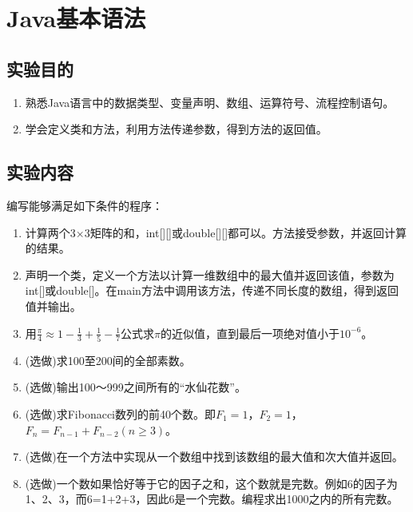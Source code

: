 ﻿\documentclass[cs5size,b5paper,nofonts,twoside]{ctexart}
\begin{document}
{\linespread{1}}

{\linespread{1}}

{\linespread{1}}

{\linespread{1}}

\clearpage
\section{Java基本语法}
\subsection{实验目的}
\begin{enumerate}
\item 熟悉Java语言中的数据类型、变量声明、数组、运算符号、流程控制语句。
\item 学会定义类和方法，利用方法传递参数，得到方法的返回值。
\end{enumerate}
\subsection{实验内容}
编写能够满足如下条件的程序：
\begin{enumerate}
\item 计算两个3$\times$3矩阵的和，int[][]或double[][]都可以。方法接受参数，并返回计算的结果。
\item 声明一个类，定义一个方法以计算一维数组中的最大值并返回该值，参数为int[]或double[]。在main方法中调用该方法，传递不同长度的数组，得到返回值并输出。
\item 用$\frac{\pi}{4}\approx 1-\frac{1}{3}+\frac{1}{5}-\frac{1}{7}$公式求$\pi$的近似值，直到最后一项绝对值小于$10^{-6}$。
\item (选做)求100至200间的全部素数。
\item (选做)输出100～999之间所有的“水仙花数”。
\item (选做)求Fibonacci数列的前40个数。即$F_1=1$，$F_2=1$，$F_n=F_{n-1}+F_{n-2} (n\ge 3)$。
\item (选做)在一个方法中实现从一个数组中找到该数组的最大值和次大值并返回。
\item (选做)一个数如果恰好等于它的因子之和，这个数就是完数。例如6的因子为1、2、3，而6=1+2+3，因此6是一个完数。编程求出1000之内的所有完数。
\end{enumerate}
\end{document}
